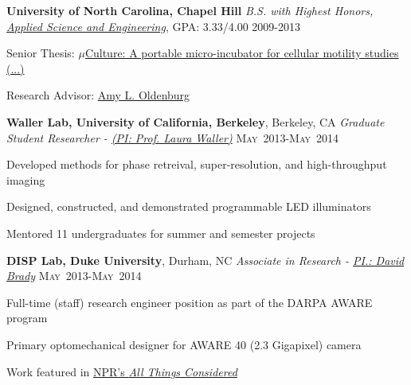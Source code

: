 \documentclass[12pt,letterpaper]{article}
\newenvironment{itemize*}%
{\begin{itemize}%
  \setlength{\itemsep}{0pt}}%
{\end{itemize}}
\newcommand{\mhead}[1]{\leavevmode\marginpar{\sffamily\footnotesize #1}}
\newcommand{\rdate}[1]{{} \hfill #1}
\begin{document}
\textbf{University of North Carolina, Chapel Hill} \newline
\emph{B.S. with Highest Honors, \href{https://www.bme.unc.edu/}{Applied Science and Engineering}}, GPA: 3.33/4.00 \rdate{2009-2013}
\begin{itemize*}
  \item Senior Thesis: \href{https://dl.dropbox.com/u/10724484/resume/ME492_2012_Design_Report_PulseWaterJet.pdf}{$\mu$Culture: A portable micro-incubator for cellular motility studies (...)}
  \item Research Advisor: \href{http://user.physics.unc.edu/~aold/people.htm}{Amy L. Oldenburg}
\end{itemize*}

\medskip
\mhead{Research \newline Experience}%
\textbf{Waller Lab, \textbf{University of California, Berkeley}}, Berkeley, CA \newline
\emph{Graduate Student Researcher - \href{http://www.laurawaller.com}{(PI: Prof. Laura Waller)}} \rdate{\textsc{May}~2013-\textsc{May}~2014}
\begin{itemize*}
  \item Developed methods for phase retreival, super-resolution, and high-throughput imaging
  \item Designed, constructed, and demonstrated  programmable LED illuminators
  \item Mentored 11 undergraduates for summer and semester projects
\end{itemize*}

\smallskip
\textbf{DISP Lab, \textbf{Duke University}}, Durham, NC \newline
\emph{Associate in Research - \href{http://www.disp.duke.edu/}{PI.: David Brady} } \rdate{\textsc{May}~2013-\textsc{May}~2014}
\begin{itemize*}
 	\item Full-time (staff) research engineer position as part of the DARPA AWARE program
	\item Primary optomechanical designer for AWARE 40 (2.3 Gigapixel) camera
	\item Work featured in \href{http://www.npr.org/2013/12/10/250000359/supercamera-more-pixels-than-you-know-what-to-do-with}{NPR's \textit{All Things Considered}}
\end{itemize*}
\end{document}
